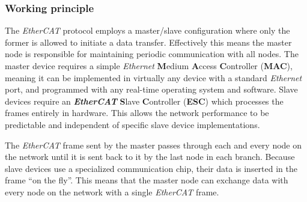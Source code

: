 \subsubsection{Working principle} \label{subsec:ecat_principle}

The \emph{EtherCAT} protocol employs a master/slave configuration where only the former is allowed to initiate a data transfer.
Effectively this means the master node is responsible for maintaining periodic communication with all nodes.
The master device requires a simple \emph{Ethernet} \textbf Medium \textbf Access \textbf Controller ({\bfseries MAC}), meaning it can be implemented in virtually any device with a standard \emph{Ethernet} port, and programmed with any real-time operating system and software.
Slave devices require an \textbf \emph{EtherCAT} \textbf Slave \textbf Controller ({\bfseries ESC}) which processes the frames entirely in hardware.
This allows the network performance to be predictable and independent of specific slave device implementations.

The \emph{EtherCAT} frame sent by the master passes through each and every node on the network until it is sent back to it by the last node in each branch.
Because slave devices use a specialized communication chip, their data is inserted in the frame ``on the fly''.
This means that the master node can exchange data with every node on the network with a single \emph{EtherCAT} frame.
